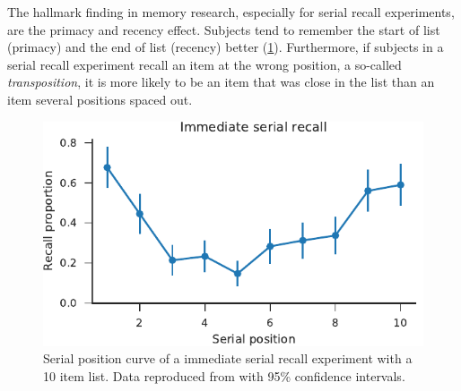 The hallmark finding in memory research, especially for serial recall experiments, are the primacy and recency effect.
Subjects tend to remember the start of list (primacy) and the end of list (recency) better (\cref{fig:exp-serial-pos}).
Furthermore, if subjects in a serial recall experiment recall an item at the wrong position, a so-called \emph{transposition}, it is more likely to be an item that was close in the list than an item several positions spaced out.
\begin{figure}
    \centering
    \includegraphics{figures/exp-serial-pos}
    \caption[Immediate serial recall position curve]{Serial position curve of a immediate serial recall experiment with a 10 item list. Data reproduced from \textcite{Jahnke1968} with 95\% confidence intervals.}\label{fig:exp-serial-pos}
\end{figure}


